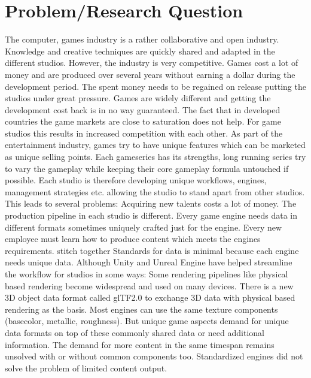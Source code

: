 \documentclass[10pt,a4paper]{article}
\begin{document}
\section{Problem/Research Question}
\begin{multicols}{2}
The computer, games industry is a rather collaborative and open industry. Knowledge and creative techniques are quickly shared and adapted in the different studios. However, the industry is very competitive. Games cost a lot of money and are produced over several years without earning a dollar during the development period. The spent money needs to be regained on release putting the studios under great pressure. Games are widely different and getting the development cost back is in no way guaranteed. The fact that in developed countries the game markets are close to saturation\cite{Koster2018} does not help. For game studios this results in increased competition with each other. As part of the entertainment industry, games try to have unique features which can be marketed as unique selling points. Each gameseries has its strengths, long running series try to vary the gameplay while keeping their core gameplay formula untouched if possible. Each studio is therefore developing unique workflows, engines, management strategies etc. allowing the studio to stand apart from other studios. This leads to several problems: Acquiring new talents costs a lot of money. The production pipeline in each studio is different. Every game engine needs data in different formats sometimes uniquely crafted just for the engine. Every new employee must learn how to produce content which meets the engines requirements. 
stitch together
Standards for data is minimal because each engine needs unique data. Although Unity and Unreal Engine have helped streamline the workflow for studios in some ways: Some rendering pipelines like physical based rendering become widespread and used on many devices. There is a new 3D object data format called glTF2.0 to exchange 3D data with physical based rendering as the basis\cite{TheKhronosGroup}. Most engines can use the same texture components (basecolor, metallic, roughness). But unique game aspects demand for unique data formats on top of these commonly shared data or need additional information. The demand for more content in the same timespan remains unsolved with or without common components too. Standardized engines did not solve the problem of limited content output\cite{Koster2018}.


\end{multicols}
\end{document}
